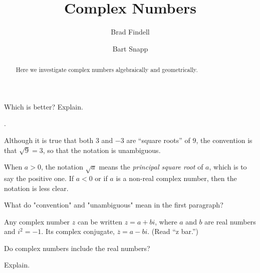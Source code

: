 \documentclass{ximera}
\title{Complex Numbers}
\author{Brad Findell \and Bart Snapp}
\begin{document}
\begin{abstract}
Here we investigate complex numbers algebraically and geometrically.
\end{abstract}
\maketitle

\begin{question}
Which is better?  Explain. 
\begin{multipleChoice}
. 
\end{multipleChoice}
\end{question}


\begin{question}
Although it is true that both $3$ and $-3$ are ``square roots'' of $9$, the convention is that $\sqrt{9}=3$, so that the notation is unambiguous.  

When $a>0$, the notation $\sqrt{a}$ means the \emph{principal square root} of $a$, which is to say the positive one.  If $a<0$ or if $a$ is a non-real complex number, then the notation is less clear.

What do "convention" and "unambiguous" mean in the first paragraph? 
\end{question}

\begin{question}
Any complex number $z$ can be written $z=a+bi$, where $a$ and $b$ are real numbers and $i^{2}=-1$.  Its complex conjugate, $\overline{z}=a-bi$.  (Read ``z bar.'')

Do complex numbers include the real numbers?  
\begin{multipleChoice}
\end{multipleChoice}
Explain. 
\begin{freeResponse}
\end{freeResponse}


\end{question}
\end{document}
